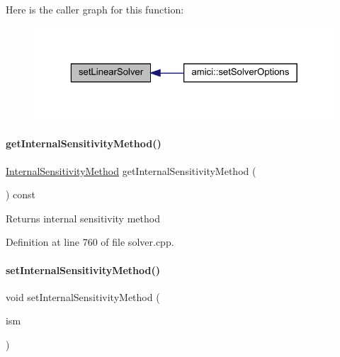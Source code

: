 Here is the caller graph for this function\+:
\nopagebreak
\begin{figure}[H]
\begin{center}
\leavevmode
\includegraphics[width=323pt]{classamici_1_1_solver_acc8ecf11ad5a8480dd02f757faa264b2_icgraph}
\end{center}
\end{figure}
\mbox{\label{classamici_1_1_solver_a256c45c84346e83402b665493e04e65e}} 
\paragraph{\texorpdfstring{get\+Internal\+Sensitivity\+Method()}{getInternalSensitivityMethod()}}
{\footnotesize\ttfamily \mbox{\hyperlink{namespaceamici_aa444c52f0a5638d68702d1ec92f8db87}{Internal\+Sensitivity\+Method}} get\+Internal\+Sensitivity\+Method (\begin{DoxyParamCaption}{ }\end{DoxyParamCaption}) const}

\begin{DoxyReturn}{Returns}
internal sensitivity method 
\end{DoxyReturn}


Definition at line 760 of file solver.\+cpp.

\mbox{\label{classamici_1_1_solver_ab114a079f23232a521ad2e81a0a30e36}} 
\paragraph{\texorpdfstring{set\+Internal\+Sensitivity\+Method()}{setInternalSensitivityMethod()}}
{\footnotesize\ttfamily void set\+Internal\+Sensitivity\+Method (\begin{DoxyParamCaption}\item[{\mbox{\hyperlink{namespaceamici_aa444c52f0a5638d68702d1ec92f8db87}{Internal\+Sensitivity\+Method}}}]{ism }\end{DoxyParamCaption})}


